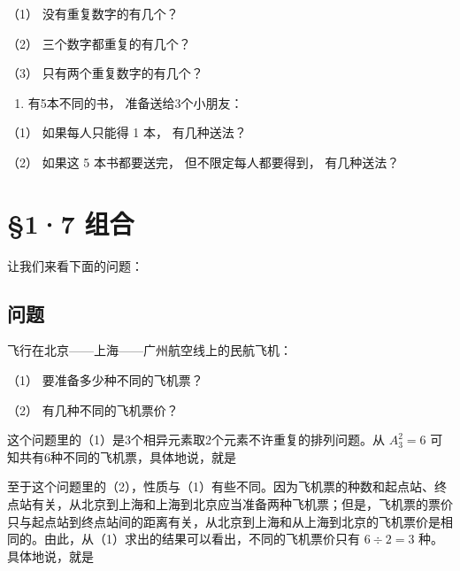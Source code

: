 （1） 没有重复数字的有几个？

（2） 三个数字都重复的有几个？

（3） 只有两个重复数字的有几个？

\begin{enumerate}[start=4]
\item
  有5本不同的书， 准备送给3个小朋友：
\end{enumerate}

（1） 如果每人只能得 1 本， 有几种送法？

（2） 如果这 5 本书都要送完， 但不限定每人都要得到， 有几种送法？

\section{§1·7 组合}

让我们来看下面的问题：

\subsection{问题}

飞行在北京------上海------广州航空线上的民航飞机：

（1） 要准备多少种不同的飞机票？

（2） 有几种不同的飞机票价？

这个问题里的（1）是3个相异元素取2个元素不许重复的排列问题。从
\(A_{3}^{2}=6\) 可知共有6种不同的飞机票，具体地说，就是

\begin{figure}
\centering
{}
\end{figure}

至于这个问题里的（2），性质与（1）有些不同。因为飞机票的种数和起点站、终点站有关，从北京到上海和上海到北京应当准备两种飞机票；但是，飞机票的票价只与起点站到终点站间的距离有关，从北京到上海和从上海到北京的飞机票价是相同的。由此，从（1）求出的结果可以看出，不同的飞机票价只有
\(6\div2=3\) 种。具体地说，就是

